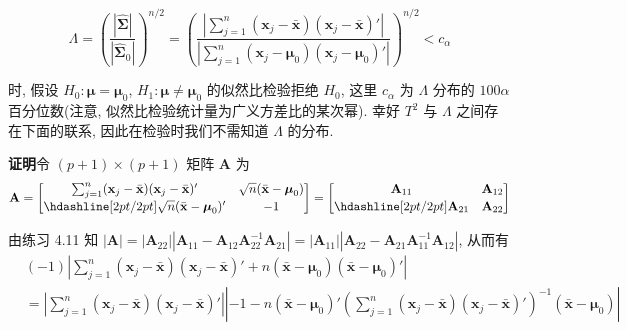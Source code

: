 \label{eq:5-13}
\begin{equation}
\Lambda=\left(\frac{|\hat{\boldsymbol{\Sigma}}|}{|\hat{\boldsymbol{\Sigma}}_0|}\right)^{n/2}=\left(\frac{\left|\sum_{j=1}^{n}(\mathbf{x}_j-\bar{\mathbf{x}})(\mathbf{x}_j-\bar{\mathbf{x}})'\right|}{\left|\sum_{j=1}^{n}(\mathbf{x}_j-\boldsymbol{\mu}_0)(\mathbf{x}_j-\boldsymbol{\mu}_0)'\right|}\right)^{n/2}<c_\alpha \tag{5-13}
\end{equation}

时, 假设 $H_0: \boldsymbol{\mu}=\boldsymbol{\mu}_0$, $H_1: \boldsymbol{\mu}\neq\boldsymbol{\mu}_0$ 的似然比检验拒绝 $H_0$, 这里 $c_\alpha$ 为 $\Lambda$ 分布的 $100\alpha$ 百分位数(注意, 似然比检验统计量为广义方差比的某次幂). 幸好 $T^2$ 与 $\Lambda$ 之间存在下面的联系, 因此在检验时我们不需知道 $\Lambda$ 的分布.


\noindent\textbf{证明}\quad 令 $(p+1)\times(p+1)$ 矩阵 $\mathbf{A}$ 为
\[
\mathbf{A}=\begin{bmatrix}\sum_{j=1}^{n}(\mathbf{x}_j-\bar{\mathbf{x}})(\mathbf{x}_j-\bar{\mathbf{x}})' & \sqrt{n}(\bar{\mathbf{x}}-\boldsymbol{\mu}_0)\\[2pt] \hdashline[2pt/2pt] \sqrt{n}(\bar{\mathbf{x}}-\boldsymbol{\mu}_0)' & -1\end{bmatrix}=\begin{bmatrix}\mathbf{A}_{11} & \mathbf{A}_{12}\\[2pt] \hdashline[2pt/2pt] \mathbf{A}_{21} & \mathbf{A}_{22}\end{bmatrix}
\]

由练习 4.11 知 $|\mathbf{A}|=|\mathbf{A}_{22}||\mathbf{A}_{11}-\mathbf{A}_{12}\mathbf{A}_{22}^{-1}\mathbf{A}_{21}|=|\mathbf{A}_{11}||\mathbf{A}_{22}-\mathbf{A}_{21}\mathbf{A}_{11}^{-1}\mathbf{A}_{12}|$, 从而有
\[
\begin{aligned}
&(-1)\left|\sum_{j=1}^{n}(\mathbf{x}_j-\bar{\mathbf{x}})(\mathbf{x}_j-\bar{\mathbf{x}})'+n(\bar{\mathbf{x}}-\boldsymbol{\mu}_0)(\bar{\mathbf{x}}-\boldsymbol{\mu}_0)'\right|\\
&=\left|\sum_{j=1}^{n}(\mathbf{x}_j-\bar{\mathbf{x}})(\mathbf{x}_j-\bar{\mathbf{x}})'\right|\left|-1-n(\bar{\mathbf{x}}-\boldsymbol{\mu}_0)'\left(\sum_{j=1}^{n}(\mathbf{x}_j-\bar{\mathbf{x}})(\mathbf{x}_j-\bar{\mathbf{x}})'\right)^{-1}(\bar{\mathbf{x}}-\boldsymbol{\mu}_0)\right|
\end{aligned}
\]

